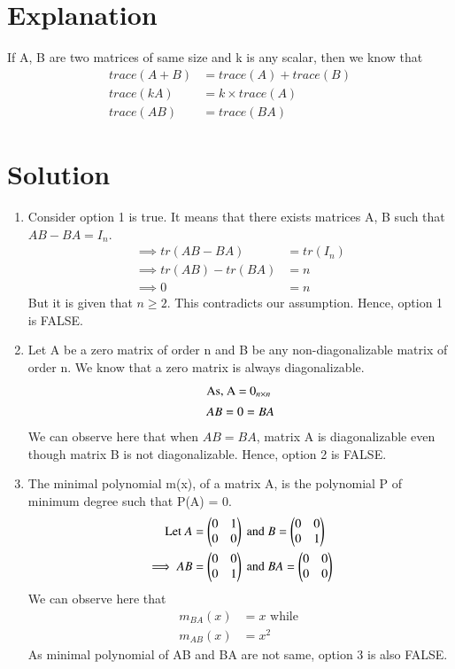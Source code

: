 \documentclass[journal,12pt,twocolumn]{IEEEtran}
\begin{document}
\section{Explanation}
If A, B are two matrices of same size and k is any scalar, then we know that 
\begin{align}
    trace(A+B) &= trace(A) + trace(B)\\
    trace(kA) &= k \times trace(A) \\
    trace(AB) &= trace(BA)
\end{align}
\section{Solution}
\begin{enumerate}
    \item Consider option 1 is true. It means that there exists matrices A, B such that $AB - BA = I_n$.
    \begin{align}
        \implies tr(AB - BA) &= tr(I_n) \\
        \implies tr(AB) - tr(BA) &= n \\
        \implies 0 &= n
    \end{align}
    But it is given that $n \geq 2$. This contradicts our assumption. Hence, option 1 is FALSE. 
    
    \item   Let A be a zero matrix of order n and B be any non-diagonalizable matrix of order n. We know that a zero matrix is always diagonalizable. 
    \begin{align}
        \intertext{As, A = $0_{ n\times n }$}
        AB = 0 = BA 
    \end{align}
    We can observe here that when $AB = BA$, matrix A is diagonalizable even though matrix B is not diagonalizable. Hence, option 2 is FALSE.
    
    \item The minimal polynomial m(x), of a matrix A, is the polynomial P of minimum degree such that P(A) = 0.
    \begin{align}
        \text{Let } A &= \begin{pmatrix}0 & 1 \\ 0 & 0\end{pmatrix} \text{ and } B = \begin{pmatrix}0 & 0 \\ 0 & 1\end{pmatrix} \\
        \implies AB &= \begin{pmatrix}0 & 0 \\ 0 & 1\end{pmatrix} \text{ and } BA = \begin{pmatrix}0 & 0 \\ 0 & 0\end{pmatrix}
    \end{align}
    We can observe here that 
    \begin{align}
        m_{BA}(x) &= x \text{ while } \\
        m_{AB}(x) &= x^2
    \end{align}
    As minimal polynomial of AB and BA are not same, option 3 is also FALSE. 
    

\end{enumerate}
\end{document}
